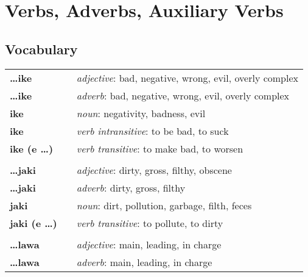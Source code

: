 
\section{Verbs, Adverbs, Auxiliary Verbs}
\subsection*{Vocabulary}

\begin{supertabular}{p{2,5cm}|ll}
    \textbf{\dots ike}       &  & \textit{adjective}: bad, negative, wrong, evil, overly complex                 \\
    \textbf{\dots ike}       &  & \textit{adverb}: bad, negative, wrong, evil, overly complex                    \\
    \textbf{ike}             &  & \textit{noun}: negativity, badness, evil                                       \\
    \textbf{ike}             &  & \textit{verb intransitive}: to be bad, to suck                                 \\
    \textbf{ike (e \dots)}   &  & \textit{verb transitive}: to make bad, to worsen                               \\
                             &  &                                                                                \\
    \textbf{\dots jaki}      &  & \textit{adjective}: dirty, gross, filthy, obscene                              \\
    \textbf{\dots jaki}      &  & \textit{adverb}: dirty, gross, filthy                                          \\
    \textbf{jaki}            &  & \textit{noun}: dirt, pollution, garbage, filth, feces                          \\
    \textbf{jaki (e \dots)}  &  & \textit{verb transitive}: to pollute, to dirty                                 \\
                             &  &                                                                                \\
    \textbf{\dots lawa}      &  & \textit{adjective}: main, leading, in charge                                   \\
    \textbf{\dots lawa}      &  & \textit{adverb}: main, leading, in charge                                      \\

\end{supertabular}
